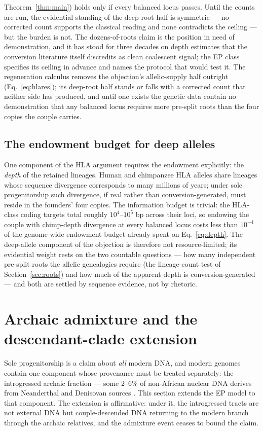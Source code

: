 Theorem~\ref{thm:main}) holds only if every balanced locus passes. Until
the counts are run, the evidential standing of the deep-root half is
symmetric --- no corrected count supports the classical reading and none
contradicts the ceiling --- but the burden is not. The dozens-of-roots
claim is the position in need of demonstration, and it has stood for three
decades on depth estimates that the conversion literature itself
discredits as clean coalescent signal; the EP class specifies its ceiling
in advance and names the protocol that would test it. The regeneration
calculus removes the objection's allelic-supply half outright
(Eq.~\eqref{eq:hlares}); its deep-root half stands or falls with a
corrected count that neither side has produced, and until one exists the
genetic data contain no demonstration that any balanced locus requires
more pre-split roots than the four copies the couple carries.

\subsection{The endowment budget for deep alleles}
One component of the HLA argument requires the endowment explicitly: the
\emph{depth} of the retained lineages. Human and chimpanzee HLA alleles
share lineages whose sequence divergence corresponds to many millions of
years; under sole progenitorship such divergence, if real rather than
conversion-generated, must reside in the founders' four copies. The
information budget is trivial: the HLA-class coding targets total roughly
$10^4$--$10^5$ bp across their loci, so endowing the couple with
chimp-depth divergence at every balanced locus costs less than
$10^{-4}$ of the genome-wide endowment budget already spent on
Eq.~\eqref{eq:depth}. The deep-allele component of the objection is
therefore not resource-limited; its evidential weight rests on the two
countable questions --- how many independent pre-split roots the allelic
genealogies require (the lineage-count test of Section~\ref{sec:roots})
and how much of the apparent depth is conversion-generated --- and both
are settled by sequence evidence, not by rhetoric.

\section{Archaic admixture and the descendant-clade extension}\label{sec:scope}

Sole progenitorship is a claim about \emph{all} modern DNA, and modern
genomes contain one component whose provenance must be treated separately:
the introgressed archaic fraction --- some $2$--$6\%$ of non-African nuclear
DNA derives from Neanderthal and Denisovan sources
\citep{Sankararaman2012,Sankararaman2014,Pruefer2014}. This section extends
the EP model to that component. The extension is affirmative: under it, the
introgressed tracts are not external DNA but couple-descended DNA returning
to the modern branch through the archaic relatives, and the admixture event
ceases to bound the claim.

